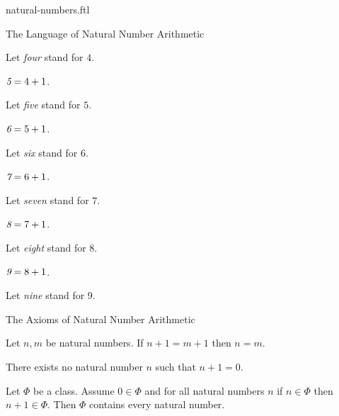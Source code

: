 \documentclass{naproche-library}
\begin{document}
\begin{smodule}[title=Natural Numbers]{natural-numbers.ftl}
\begin{sfragment}{The Language of Natural Number Arithmetic}
\begin{definition}[forthel,id=ARITHMETIC_01_1709884968009728]
    Let \emph{four} stand for $4$.
  \end{definition}

  \begin{definition}[forthel,id=ARITHMETIC_01_6734726333202432]
    $\emph{5} = 4 + 1$.

    Let \emph{five} stand for $5$.
  \end{definition}

  \begin{definition}[forthel,id=ARITHMETIC_01_949139189792768]
    $\emph{6} = 5 + 1$.

    Let \emph{six} stand for $6$.
  \end{definition}

  \begin{definition}[forthel,id=ARITHMETIC_01_7245471749767168]
    $\emph{7} = 6 + 1$.

    Let \emph{seven} stand for $7$.
  \end{definition}

  \begin{definition}[forthel,id=ARITHMETIC_01_5658172888973312]
    $\emph{8} = 7 + 1$.

    Let \emph{eight} stand for $8$.
  \end{definition}

  \begin{definition}[forthel,id=ARITHMETIC_01_7371844250238976]
    $\emph{9} = 8 + 1$.

    Let \emph{nine} stand for $9$.
  \end{definition}
\end{sfragment}

\begin{sfragment}{The Axioms of Natural Number Arithmetic}
  \begin{axiom}[forthel,id=ARITHMETIC_01_3604163883696128]
    Let $n, m$ be natural numbers.
    If $n + 1 = m + 1$ then $n = m$.
  \end{axiom}

  \begin{axiom}[forthel,id=ARITHMETIC_01_4454289938317312]
    There exists no natural number $n$ such that $n + 1 = 0$.
  \end{axiom}

  \begin{axiom}[forthel,title=Induction,id=ARITHMETIC_01_4764664342773760]
    Let $\Phi$ be a class.
    Assume $0 \in \Phi$ and for all natural numbers $n$ if $n \in \Phi$ then
    $n + 1 \in \Phi$.
    Then $\Phi$ contains every natural number.
  \end{axiom}


\end{sfragment}
\end{smodule}
\end{document}
